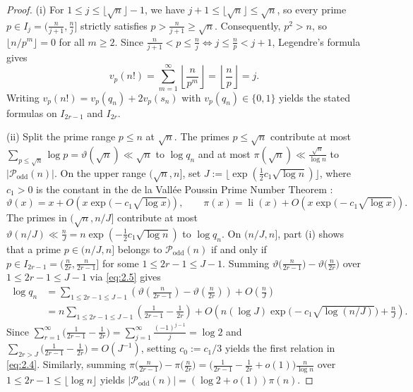 \documentclass[11pt,reqno]{amsart}
\theoremstyle{remark}
\numberwithin{equation}{section}
\newcommand{\Podd}{\mathcal{P}_{\mathrm{odd}}}
\DeclareMathOperator{\li}{li}
\begin{document}
\begin{proof}
(i) For $1 \le j \le \lfloor \sqrt{n} \rfloor - 1$, we have $j + 1 \le \lfloor \sqrt{n} \rfloor \le \sqrt{n}$, so every prime $p \in I_j = \bigl(\frac{n}{j+1}, \frac{n}{j}\bigr]$ strictly satisfies $p > \frac{n}{j+1} \ge \sqrt{n}$. Consequently, $p^2 > n$, so $\lfloor n/p^m \rfloor = 0$ for all $m \ge 2$. Since $\frac{n}{j+1} < p \le \frac{n}{j} \iff j \le \frac{n}{p} < j + 1$, Legendre's formula \cite{Legendre1798} gives
\[
v_p(n!) = \sum_{m=1}^\infty \left\lfloor \frac{n}{p^m} \right\rfloor = \left\lfloor \frac{n}{p} \right\rfloor = j.
\]
Writing $v_p(n!) = v_p(q_n) + 2v_p(s_n)$ with $v_p(q_n) \in \{0, 1\}$ yields the stated formulas on $I_{2r-1}$ and $I_{2r}$.

(ii) Split the prime range $p \le n$ at $\sqrt{n}$. The primes $p \le \sqrt{n}$ contribute at most $\sum_{p \le \sqrt{n}} \log p = \vartheta(\sqrt{n}) \ll \sqrt{n}$ to $\log q_n$ and at most $\pi(\sqrt{n}) \ll \frac{\sqrt{n}}{\log n}$ to $|\Podd(n)|$. On the upper range $(\sqrt{n}, n]$, set $J := \lfloor \exp(\frac{1}{2}c_1\sqrt{\log n}) \rfloor$, where $c_1 > 0$ is the constant in the de la Vall\'ee Poussin Prime Number Theorem \cite[Chapter~18]{Davenport2000}:
\begin{equation}\label{eq:2.5}
\vartheta(x) = x + O\!\left(x\exp\bigl(-c_1\sqrt{\log x}\bigr)\right), \qquad \pi(x) = \li(x) + O\!\left(x\exp\bigl(-c_1\sqrt{\log x}\bigr)\right).
\end{equation}
The primes in $(\sqrt{n}, n/J]$ contribute at most $\vartheta(n/J) \ll \frac{n}{J} = n\exp(-\frac{1}{2}c_1\sqrt{\log n})$ to $\log q_n$. On $(n/J, n]$, part (i) shows that a prime $p \in (n/J, n]$ belongs to $\Podd(n)$ if and only if $p \in I_{2r-1} = \bigl(\frac{n}{2r}, \frac{n}{2r-1}\bigr]$ for some $1 \le 2r - 1 \le J - 1$. Summing $\vartheta\bigl(\frac{n}{2r-1}\bigr) - \vartheta\bigl(\frac{n}{2r}\bigr)$ over $1 \le 2r - 1 \le J - 1$ via \eqref{eq:2.5} gives
\begin{align*}
\log q_n &= \sum_{1 \le 2r-1 \le J-1} \left(\vartheta\!\left(\frac{n}{2r - 1}\right) - \vartheta\!\left(\frac{n}{2r}\right)\right) + O\!\left(\frac{n}{J}\right) \\
&= n \sum_{1 \le 2r-1 \le J-1} \left(\frac{1}{2r - 1} - \frac{1}{2r}\right) + O\!\left(n(\log J)\exp\bigl(-c_1\sqrt{\log(n/J)}\bigr) + \frac{n}{J}\right).
\end{align*}
Since $\sum_{r=1}^\infty \bigl(\frac{1}{2r-1} - \frac{1}{2r}\bigr) = \sum_{j=1}^\infty \frac{(-1)^{j-1}}{j} = \log 2$ and $\sum_{2r > J} \bigl(\frac{1}{2r-1} - \frac{1}{2r}\bigr) = O(J^{-1})$, setting $c_0 := c_1/3$ yields the first relation in \eqref{eq:2.4}. Similarly, summing $\pi\bigl(\frac{n}{2r-1}\bigr) - \pi\bigl(\frac{n}{2r}\bigr) = \bigl(\frac{1}{2r-1} - \frac{1}{2r} + o(1)\bigr)\frac{n}{\log n}$ over $1 \le 2r - 1 \le \lfloor \log n \rfloor$ yields $|\Podd(n)| = (\log 2 + o(1))\pi(n)$.
\end{proof}
\end{document}
